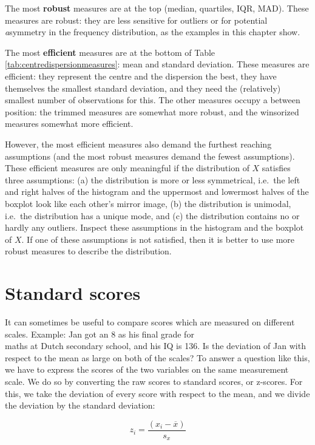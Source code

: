 \documentclass[
]{book}
\begin{document}
The most \textbf{robust} measures are
at the top (median, quartiles, IQR, MAD). These measures are robust:
they are less sensitive for outliers or for potential \emph{a}symmetry in the
frequency distribution, as the examples in this chapter show.

The most \textbf{efficient} measures are at the bottom of
Table \ref{tab:centredispersionmeasures}: mean and standard deviation.
These measures are efficient: they represent the centre and the dispersion
the best, they have themselves the smallest standard deviation, and they need
the (relatively) smallest number of observations for this. The other measures
occupy a between position: the trimmed measures are somewhat more robust,
and the winsorized measures somewhat more efficient.

However, the most efficient measures also demand the furthest reaching
assumptions (and the most robust measures demand the fewest assumptions).
These efficient measures are only meaningful if the distribution of \(X\)
satisfies three assumptions: (a) the distribution is more or less
symmetrical, i.e.~the left and right halves of the histogram and
the uppermost and lowermost halves of the boxplot look like each other's
mirror image, (b) the distribution is unimodal, i.e.~the distribution has
a unique mode, and (c) the distribution contains no or hardly any outliers.
Inspect these assumptions in the histogram and the boxplot of \(X\). If one
of these assumptions is not satisfied, then it is better to use
more robust measures to describe the distribution.

\hypertarget{sec:standardscores}{%
\section{Standard scores}\label{sec:standardscores}}

It can sometimes be useful to compare scores which are measured on
different scales. Example: Jan got an 8 as his final grade for\\
maths at Dutch secondary school, and his IQ is 136. Is the deviation of Jan with
respect to the mean as large on both of the scales? To answer a question
like this, we have to express the scores of the two variables on the
same measurement scale. We do so by converting the raw scores to
standard scores, or z-scores. For this, we take the deviation of every
score with respect to the mean, and we divide the deviation by the
standard deviation:

\begin{equation}
    z_i = \frac{(x_i-\overline{x})}{s_x}
   \label{eq:zscores}
\end{equation}
\end{document}
